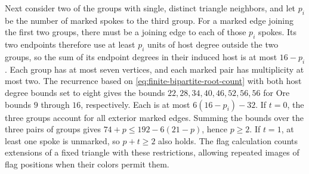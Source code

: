 Next consider two of the groups with single, distinct
triangle neighbors, and let $p_i$ be the number of
marked spokes to the third group. For a marked edge joining the
first two groups, there must be a joining edge to each of those $p_i$
spokes. Its two endpoints therefore use at least $p_i$
units of host degree outside the two groups, so the sum of its
endpoint degrees in their induced host is at most $16-p_i$.
Each group has at most seven vertices, and
each marked pair has multiplicity at most two. The
recurrence based on \eqref{eq:finite-bipartite-root-count} with both host degree bounds set to
eight gives the bounds $22,28,34,40,46,52,56,56$ for
Ore bounds $9$ through $16$, respectively. Each is at
most $6(16-p_i)-32$. If $t=0$, the three groups account
for all exterior marked edges. Summing the bounds over
the three pairs of groups gives $74+p\le192-6(21-p)$,
hence $p\ge2$. If $t=1$, at least one spoke is unmarked,
so $p+t\ge2$ also holds. The flag calculation counts
extensions of a fixed triangle with these restrictions,
allowing repeated images of flag positions when their
colors permit them.
